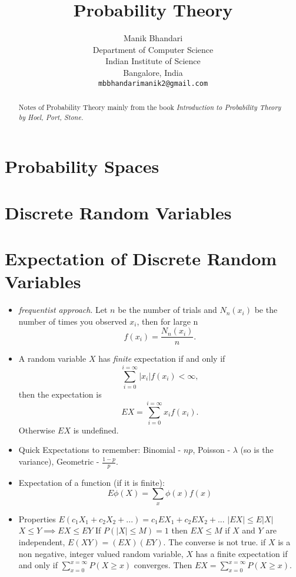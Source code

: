 \documentclass{article}
\title{Probability Theory}
\author{
	Manik Bhandari\\
	Department of Computer Science\\
	Indian Institute of Science\\
	Bangalore, India \\
	\texttt{mbbhandarimanik2@gmail.com} \\
}
\begin{document}
	
	\maketitle
	
	\begin{abstract}
		Notes of Probability Theory mainly from the book \textit{Introduction to Probability Theory by Hoel, Port, Stone.}
	\end{abstract}
	
	\section{Probability Spaces}
	
	\section{Discrete Random Variables}
	
	\section{Expectation of Discrete Random Variables}
	\begin{itemize}
		\item \emph{frequentist approach}. Let $n$ be the number of trials and $N_n(x_i)$ be the number of times you observed $x_i$, then for large n \[f(x_i) = \frac{N_n(x_i)}{n}.\]
		\item A random variable $X$ has \textit{finite} expectation if and only if \[\sum_{i=0}^{i=\infty}|x_i|f(x_i) < \infty, \] then the expectation is \[EX = \sum_{i=0}^{i=\infty}x_if(x_i).\]
				Otherwise $EX$ is undefined.
		\item Quick Expectations to remember: Binomial - $np$, Poisson - $\lambda$ (so is the variance), Geometric - $\frac{1-p}{p}$.
		\item Expectation of a function (if it is finite): \[E\phi(X) = \sum_{x}\phi(x)f(x)\]
		\item Properties
			\subitem $E(c_1X_1 + c_2X_2 + ...) = c_1EX_1 + c_2EX_2 + ...$
			\subitem $|EX| \leq E|X|$
			\subitem $X \leq Y \implies EX \leq EY$
			\subitem If $P(|X| \leq M) = 1$ then $EX \leq M$ 
			\subitem if $X$ and $Y$ are independent, $E(XY) = (EX)(EY)$. The converse is not true.
			\subitem if $X$ is a non negative, integer valued random variable, $X$ has a finite expectation if and only if $\sum_{x=0}^{x=\infty}P(X \geq x)$ converges. Then $EX = \sum_{x=0}^{x=\infty}P(X \geq x)$.
	\end{itemize}
	
\end{document}
